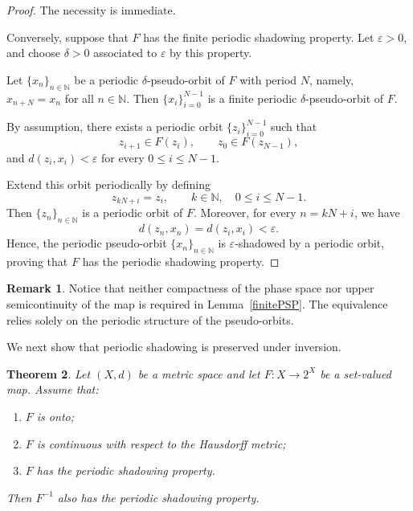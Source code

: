 \documentclass{amsart}
\newtheorem{theorem}{Theorem}[section]
\theoremstyle{definition}
\newtheorem{remark}[theorem]{Remark}
\begin{document}
\begin{proof}
The necessity is immediate.

Conversely, suppose that $F$ has the finite periodic shadowing property. Let $\varepsilon>0$, and choose $\delta>0$ associated to $\varepsilon$ by this property.

Let $\{x_n\}_{n\in\mathbb N}$ be a periodic $\delta$-pseudo-orbit of $F$ with period $N$, namely, $x_{n+N}=x_n$ for all $n\in\mathbb N$. Then $\{x_i\}_{i=0}^{N-1}$ is a finite periodic $\delta$-pseudo-orbit of $F$.

By assumption, there exists a periodic orbit $\{z_i\}_{i=0}^{N-1}$ such that
\[
z_{i+1}\in F(z_i),
\qquad
z_0\in F(z_{N-1}),
\]
and $d(z_i,x_i)<\varepsilon$ for every $0\leq i\leq N-1$.

Extend this orbit periodically by defining 
\[
z_{kN+i}=z_i,
\qquad
k\in\mathbb N,
\quad
0\leq i\leq N-1.
\]
Then $\{z_n\}_{n\in\mathbb N}$ is a periodic orbit of $F$. Moreover, for every $
n=kN+i$, we have
\[
d(z_n,x_n)
=
d(z_i,x_i)
<
\varepsilon.
\]
Hence, the periodic pseudo-orbit $\{x_n\}_{n\in\mathbb N}$ is $\varepsilon$-shadowed by a periodic orbit, proving that $F$ has the periodic shadowing property.
\end{proof}

\begin{remark}
\label{rem:compactness}
Notice that neither compactness of the phase space nor upper semicontinuity of the map is required in Lemma~\ref{finitePSP}. The equivalence relies solely on the periodic structure of the pseudo-orbits.
\end{remark}

We next show that periodic shadowing is preserved under inversion.

\begin{theorem}
\label{thm:periodic_inverse}
Let $(X,d)$ be a metric space and let $F:X\to 2^X$ be a set-valued map. Assume that:
\begin{enumerate}
\item $F$ is onto;
\item $F$ is continuous with respect to the Hausdorff metric;
\item $F$ has the periodic shadowing property.
\end{enumerate}
Then $F^{-1}$ also has the periodic shadowing property.
\end{theorem}
\end{document}
